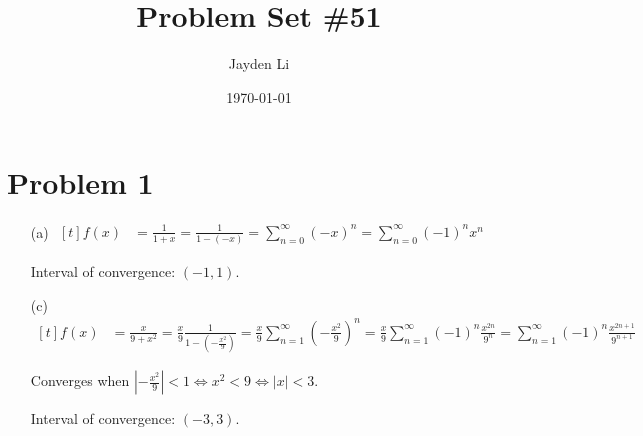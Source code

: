 \documentclass[preview, margin=0.6in]{standalone}
\title{\vspace*{-40pt}Problem Set \#51}
\author{Jayden Li}
\date{\today}
\newcommand*{\problem}[1]{\section*{Problem #1}}
\begin{document}
\fontsize{12pt}{12pt}\selectfont
\setlength{\abovedisplayskip}{\abovedisplayskip/2}
\setlength{\belowdisplayskip}{\belowdisplayskip/2}
\setlength{\parindent}{0pt}
\setlength{\parskip}{2ex plus 0.5ex minus 0.2ex}
\maketitle

\problem{1}
\begin{itemize}
	\item[(a)]
		$\begin{aligned}[t]
			f(x)
			&=\frac{1}{1+x}
			=\frac{1}{1-(-x)}
			=\sum_{n=0}^{\infty}(-x)^n
			=\boxed{\sum_{n=0}^{\infty}(-1)^n x^n}
		\end{aligned}$

		Interval of convergence: $(-1,1)$.

	\item[(c)]
		$\begin{aligned}[t]
		    f(x)
			&=\frac{x}{9+x^2}
			=\frac{x}{9}\frac{1}{1-\left(-\frac{x^2}{9}\right)}
			=\frac{x}{9}\sum_{n=1}^{\infty}\left(-\frac{x^2}{9}\right)^n
			=\frac{x}{9}\sum_{n=1}^{\infty}(-1)^n \frac{x^{2n}}{9^n}
			=\boxed{\sum_{n=1}^{\infty}(-1)^n \frac{x^{2n+1}}{9^{n+1}}}
		\end{aligned}$
		
		Converges when $\displaystyle \left|-\frac{x^2}{9}\right|<1 \iff x^2<9 \iff \left|x\right|<3$.

		Interval of convergence: $(-3,3)$.

\end{itemize}
\end{document}
